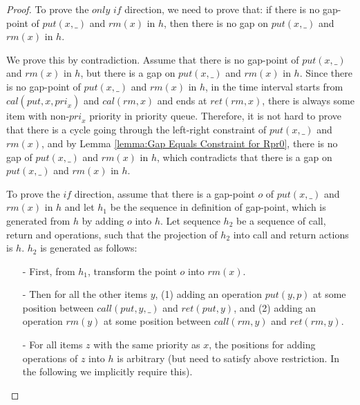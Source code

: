 \begin {proof}

To prove the $\textit{only if}$ direction, we need to prove that: if there is no gap-point of $\textit{put}(x,\_)$ and $\textit{rm}(x)$ in $h$, then there is no gap on $\textit{put}(x,\_)$ and $\textit{rm}(x)$ in $h$.

We prove this by contradiction. Assume that there is no gap-point of $\textit{put}(x,\_)$ and $\textit{rm}(x)$ in $h$, but there is a gap on $\textit{put}(x,\_)$ and $\textit{rm}(x)$ in $h$. Since there is no gap-point of $\textit{put}(x,\_)$ and $\textit{rm}(x)$ in $h$, in the time interval starts from $\textit{cal}(\textit{put},x,\textit{pri}_x)$ and $\textit{cal}(\textit{rm},x)$ and ends at $\textit{ret}(\textit{rm},x)$, there is always some item with non-$\textit{pri}_x$ priority in priority queue. Therefore, it is not hard to prove that there is a cycle going through the left-right constraint of $\textit{put}(x,\_)$ and $\textit{rm}(x)$, and by Lemma \ref{lemma:Gap Equals Constraint for Rpr0}, there is no gap of $\textit{put}(x,\_)$ and $\textit{rm}(x)$ in $h$, which contradicts that there is a gap on $\textit{put}(x,\_)$ and $\textit{rm}(x)$ in $h$.

To prove the $\textit{if}$ direction, assume that there is a gap-point $o$ of $\textit{put}(x,\_)$ and $\textit{rm}(x)$ in $h$ and let $h_1$ be the sequence in definition of gap-point, which is generated from $h$ by adding $o$ into $h$. Let sequence $h_2$ be a sequence of call, return and operations, such that the projection of $h_2$ into call and return actions is $h$. $h_2$ is generated as follows:

\begin{itemize}
\setlength{\itemsep}{0.5pt}
\item[-] First, from $h_1$, transform the point $o$ into $\textit{rm}(x)$.

\item[-] Then for all the other items $y$, (1) adding an operation $\textit{put}(y,p)$ at some position between $\textit{call}(\textit{put},y,\_)$ and $\textit{ret}(\textit{put},y)$, and (2) adding an operation $\textit{rm}(y)$ at some position between $\textit{call}(\textit{rm},y)$ and $\textit{ret}(\textit{rm},y)$.

\item[-] For all items $z$ with the same priority as $x$, the positions for adding operations of $z$ into $h$ is arbitrary (but need to satisfy above restriction. In the following we implicitly require this).


\end{itemize}
\end{proof}

